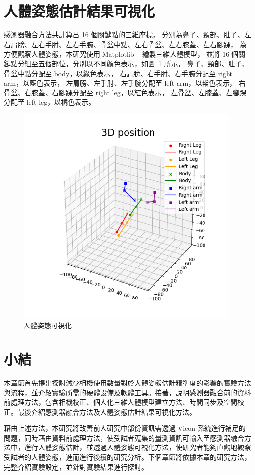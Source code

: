 \clearpage

\section{人體姿態估計結果可視化}
感測器融合方法共計算出 16 個關鍵點的三維座標，
分別為鼻子、頸部、肚子、左右肩膀、左右手肘、左右手腕、骨盆中點、左右骨盆、左右膝蓋、左右腳踝，
為方便觀察人體姿態，本研究使用 Matplotlib ~\cite{Hunter:2007} 繪製三維人體模型，
並將 16 個關鍵點分組至五個部位，分別以不同顏色表示，如圖~\ref{ch3_fig_posevis} 所示，
鼻子、頸部、肚子、骨盆中點分配至 body，以綠色表示，
右肩膀、右手肘、右手腕分配至 right arm，以藍色表示，
左肩膀、左手肘、左手腕分配至 left arm，以紫色表示，
右骨盆、右膝蓋、右腳踝分配至 right leg，以紅色表示，
左骨盆、左膝蓋、左腳踝分配至 left leg，以橘色表示。

\begin{figure}[!ht]
   \centering
   \includegraphics[width=11cm]{figure/ch3_fig_posevis.png}
    \caption[人體姿態可視化]{人體姿態可視化}
    \label{ch3_fig_posevis}
\end{figure}

\clearpage

\section{小結}
本章節首先提出探討減少相機使用數量對於人體姿態估計精準度的影響的實驗方法與流程，並介紹實驗所需的硬體設備及軟體工具。接著，說明感測器融合前的資料前處理方法，包含相機校正、個人化三維人體模型建立方法、時間同步及空間校正。最後介紹感測器融合方法及人體姿態估計結果可視化方法。

藉由上述方法，本研究將改善前人研究中部份資訊需透過 Vicon 系統進行補足的問題，同時藉由資料前處理方法，使受試者蒐集的量測資訊可輸入至感測器融合方法中，進行人體姿態估計，並透過人體姿態可視化方法，使研究者能夠直觀地觀察受試者的人體姿態，進而進行後續的研究分析。下個章節將依據本章的研究方法，完整介紹實驗設定，並針對實驗結果進行探討。
\clearpage